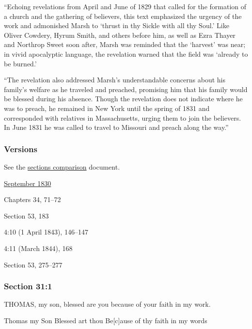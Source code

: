 			``Echoing revelations from April and June of 1829 that called for the formation of a church and the gathering of believers, this text emphasized the urgency of the work and admonished Marsh to `thrust in thy Sickle with all thy Soul.' Like Oliver Cowdery, Hyrum Smith, and others before him, as well as Ezra Thayer and Northrop Sweet soon after, Marsh was reminded that the `harvest' was near; in vivid apocalyptic language, the revelation warned that the field was `already to be burned.'
			
			``The revelation also addressed Marsh's understandable concerns about his family's welfare as he traveled and preached, promising him that his family would be blessed during his absence. Though the revelation does not indicate where he was to preach, he remained in New York until the spring of 1831 and corresponded with relatives in Massachusetts, urging them to join the believers. In June 1831 he was called to travel to Missouri and preach along the way.''
			
	\subsubsection{Versions}
		\label{DC31-V}
		
		See the \href{https://drive.google.com/file/d/1goAvNz8jS4R8slYfMG_db55Ty2z_vmgK/view?usp=sharing}{sections comparison} document.
	
		\begin{compactdesc}
			\item[JSP] \hyperref[EMS-1830-JS-SEP-1830-F]{September 1830}
			\item[BC] Chapters 34, 71--72
			\item[DC 1835] Section 53, 183
			\item[TS] 4:10 (1 April 1843), 146--147
			\item[MS] 4:11 (March 1844), 168
			\item[DC 1844] Section 53, 275--277
		\end{compactdesc}

	\subsubsection{Section 31:1} %
		\label{DC31-1}

		THOMAS, my son, blessed are you because of your faith in my work.

		\begin{framed}
		\scriptsize
			\begin{compactdesc}
				\item[JSP] Thomas my Son Blessed art thou Be[c]ause of thy faith in my words
			\end{compactdesc}
		\end{framed}

